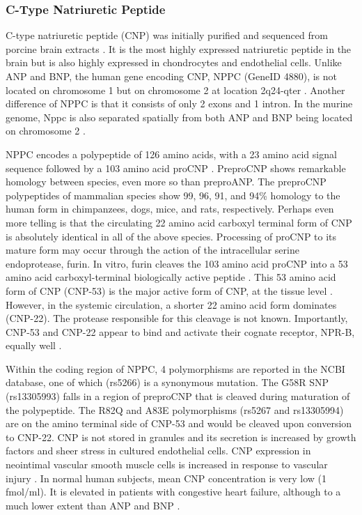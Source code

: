 \documentclass[14pt,a4paper,onecolumn]{article}
\begin{document}
\subsubsection{C-Type Natriuretic Peptide}
C-type natriuretic peptide (CNP) was initially purified and sequenced from porcine brain extracts \citep{Sudoh1990}. It is the most highly expressed natriuretic peptide in the brain but is also highly expressed in chondrocytes and endothelial cells. Unlike ANP and BNP, the human gene encoding CNP, NPPC (GeneID 4880), is not located on chromosome 1 but on chromosome 2 at location 2q24-qter \citep{Ogawa1994b}. Another difference of NPPC is that it consists of only 2 exons and 1 intron. In the murine genome, Nppc is also separated spatially from both ANP and BNP being located on chromosome 2 \citep{Ogawa1994b}.

NPPC encodes a polypeptide of 126 amino acids, with a 23 amino acid signal sequence followed by a 103 amino acid proCNP \citep{Tawaragi1991}. PreproCNP shows remarkable homology between species, even more so than preproANP. The preproCNP polypeptides of mammalian species show 99, 96, 91, and 94\% homology to the human form in chimpanzees, dogs, mice, and rats, respectively. Perhaps even more telling is that the circulating 22 amino acid carboxyl terminal form of CNP is absolutely identical in all of the above species. Processing of proCNP to its mature form may occur through the action of the intracellular serine endoprotease, furin. In vitro, furin cleaves the 103 amino acid proCNP into a 53 amino acid carboxyl-terminal biologically active peptide \citep{Wu2003}. This 53 amino acid form of CNP (CNP-53) is the major active form of CNP, at the tissue level \citep{Brown1997}. However, in the systemic circulation, a shorter 22 amino acid form dominates (CNP-22). The protease responsible for this cleavage is not known. Importantly, CNP-53 and CNP-22 appear to bind and activate their cognate receptor, NPR-B, equally well \citep{Yeung1996}.

Within the coding region of NPPC, 4 polymorphisms are reported in the NCBI database, one of which (rs5266) is a synonymous mutation. The G58R SNP (rs13305993) falls in a region of preproCNP that is cleaved during maturation of the polypeptide. The R82Q and A83E polymorphisms (rs5267 and rs13305994) are on the amino terminal side of CNP-53 and would be cleaved upon conversion to CNP-22. CNP is not stored in granules and its secretion is increased by growth factors \citep{Suga1993} \citep{Suga1992b} and sheer stress \citep{Chun1997} in cultured endothelial cells. CNP expression in neointimal vascular smooth muscle cells is increased in response to vascular injury \citep{Brown1997}. In normal human subjects, mean CNP concentration is very low (1 fmol/ml). It is elevated in patients with congestive heart failure, although to a much lower extent than ANP and BNP \citep{Charles2006} \citep{Del-Ry2005} \citep{Kalra2003}.
\end{document}
